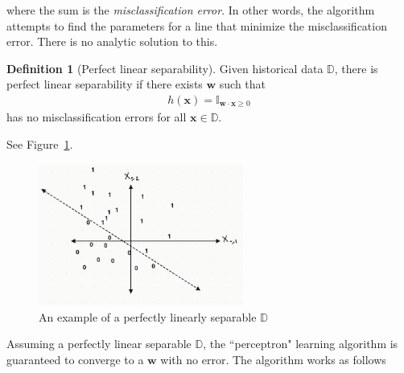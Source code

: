 \documentclass[12pt, a4paper]{article}
\theoremstyle{definition}
\newtheorem*{definition}{Definition}
\begin{document}
	where the sum is the \textit{misclassification error}. In other words, the algorithm attempts to find
	the parameters for a line that minimize the misclassification error. There is no analytic solution
	to this.
	\begin{tcolorbox}[breakable]
		\begin{definition}[Perfect linear separability]
			Given historical data $\mathbb{D}$, there is perfect linear separability if
			there exists $\mathbf{w}$ such that
			\begin{align*}
				h(\mathbf{x}) = \mathbb{I}_{\mathbf{w}\cdot \mathbf{x}\geq 0}
			\end{align*}
			has no misclassification errors for all $\mathbf{x}\in \mathbb{D}$.
		\end{definition}
	\end{tcolorbox}
	See Figure~\ref{fig:perfectly-linearly-sperable}.
	\begin{figure}
		\centering
		\includegraphics[width=0.6\textwidth]{perfectly-linearly-separable}
		\caption{An example of a perfectly linearly separable $\mathbb{D}$}
		\label{fig:perfectly-linearly-sperable}
	\end{figure}
	Assuming a perfectly linear separable $\mathbb{D}$, the ``perceptron" learning algorithm
	is guaranteed to converge to a $\mathbf{w}$ with no error. The algorithm works as
	follows
\end{document}
